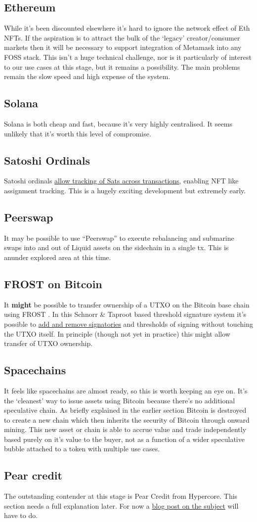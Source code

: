 \subsection{Ethereum}
While it's been discounted elsewhere it's hard to ignore the network effect of Eth NFTs. If the aspiration is to attract the bulk of the `legacy' creator/consumer markets then it will be necessary to support integration of Metamask into any FOSS stack. This isn't a huge technical challenge, nor is it particularly of interest to our use cases at this stage, but it remains a possibility. The main problems remain the slow speed and high expense of the system.
\subsection{Solana}
Solana is both cheap and fast, because it's very highly centralised. It seems unlikely that it's worth this level of compromise.
\subsection{Satoshi Ordinals}
Satoshi ordinals \href{https://github.com/casey/ord}{allow tracking of Sats across transactions}, enabling NFT like assignment tracking. This is a hugely exciting development but extremely early.
\subsection{Peerswap}
It may be possible to use ``Peerswap'' to execute rebalancing and submarine swaps into and out of Liquid assets on the sidechain in a single tx. This is anunder explored area at this time.
\subsection{FROST on Bitcoin}
It \textbf{might} be possible to transfer ownership of a UTXO on the Bitcoin base chain using FROST \cite{komlo2020frost}. In this Schnorr \& Taproot based threshold signature system it's possible to \href{https://btctranscripts.com/sydney-bitcoin-meetup/2022-03-29-socratic-seminar/}{add and remove signatories} and thresholds of signing without touching the UTXO itself. In principle (though not yet in practice) this might allow transfer of UTXO ownership. 
\subsection{Spacechains}
It feels like spacechains are almost ready, so this is worth keeping an eye on. It's the `cleanest' way to issue assets using Bitcoin because there's no additional speculative chain. As briefly explained in the earlier section Bitcoin is destroyed to create a new chain which then inherits the security of Bitcoin through onward mining. This new asset or chain is able to accrue value and trade independently based purely on it's value to the buyer, not as a function of a wider speculative bubble attached to a token with multiple use cases.
\subsection{Pear credit}
The outstanding contender at this stage is Pear Credit from Hypercore. This section needs a full explanation later. For now a \href{https://medium.com/@observer1/tether-announced-the-launch-of-pear-credit-8d4f66ccd97b}{blog post on the subject} will have to do.
